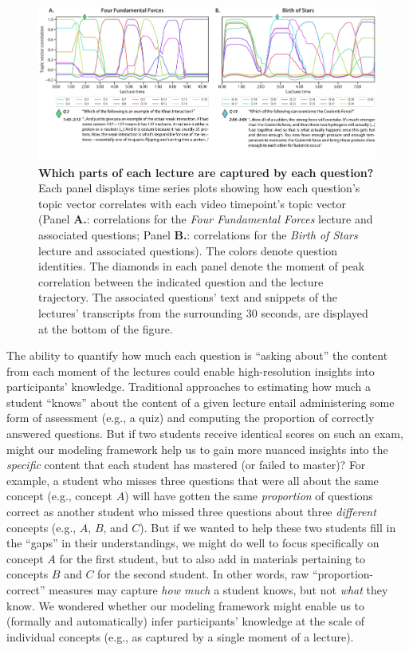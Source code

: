 \documentclass[10pt]{article}
\begin{document}
\begin{figure}[t]
    \centering
    \includegraphics[width=\textwidth]{figs/lecture-question-similarity}

    \caption{\textbf{Which parts of each lecture are captured by each
    question?} Each panel displays time series plots showing how each question's
    topic vector correlates with each video timepoint's topic vector (Panel
    \textbf{A.}: correlations for the \textit{Four Fundamental Forces} lecture
    and associated questions; Panel \textbf{B.}: correlations for the
    \textit{Birth of Stars} lecture and associated questions). The colors
    denote question identities. The diamonds in each panel denote the moment of
    peak correlation between the indicated question and the lecture trajectory.
    The associated questions' text and snippets of the lectures' transcripts
    from the surrounding 30 seconds, are displayed at the bottom of the
    figure.}

    \label{fig:question-correlations}
\end{figure}

The ability to quantify how much each question is ``asking about'' the content
from each moment of the lectures could enable high-resolution insights into
participants' knowledge. Traditional approaches to estimating how much a
student ``knows'' about the content of a given lecture entail administering some form of assessment (e.g., a quiz) and computing the
proportion of correctly answered questions. But if two students receive
identical scores on such an exam, might our modeling framework help us to gain more
nuanced insights into the \textit{specific} content that each student has
mastered (or failed to master)? For example, a student who misses three
questions that were all about the same concept (e.g., concept $A$) will have
gotten the same \textit{proportion} of questions correct as another student who
missed three questions about three \textit{different} concepts (e.g., $A$, $B$,
and $C$). But if we wanted to help these two students fill in the ``gaps'' in
their understandings, we might do well to focus specifically on concept $A$ for
the first student, but to also add in materials pertaining to concepts $B$ and
$C$ for the second student. In other words, raw ``proportion-correct'' measures
may capture \textit{how much} a student knows, but not \textit{what} they know.
We wondered whether our modeling framework might enable us to (formally and
automatically) infer participants' knowledge at the scale of individual
concepts (e.g., as captured by a single moment of a lecture).
\end{document}
